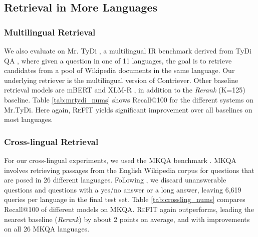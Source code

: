 \subsection{Retrieval in More Languages}
\label{sec:multilingual_results}

\subsubsection{Multilingual Retrieval}
 We also evaluate on Mr. TyDi \cite{zhang2021mr}, a multilingual IR benchmark derived from TyDi QA \cite{clark2020tydi}, where given a question in one of 11 languages, the goal is to retrieve candidates from a pool of Wikipedia documents in the same language. Our underlying retriever is the multilingual version of Contriever. Other baseline retrieval models are mBERT and XLM-R \cite{conneau2020unsupervised}, in addition to the \textit{Rerank} (K=125) baseline. Table \ref{tab:mrtydi_nums} shows Recall@100 for the different systems on Mr.TyDi. Here again, \textsc{ReFIT} yields significant improvement over all baselines on most languages.

\subsubsection{Cross-lingual Retrieval}
For our cross-lingual experiments, we used the MKQA benchmark \cite{longpre2021mkqa}. MKQA involves retrieving passages from the English Wikipedia corpus for questions that are posed in 26 different languages. Following \cite{izacard2021unsupervised}, we discard unanswerable questions and questions with a yes/no answer or a long answer, leaving 6,619 queries per language in the final test set. 
Table \ref{tab:crossling_nums} compares Recall@100 of different models on MKQA. \textsc{ReFIT} again outperforms, leading the nearest baseline (\textit{Rerank}) by about 2 points on average, and with improvements on all 26 MKQA languages.

